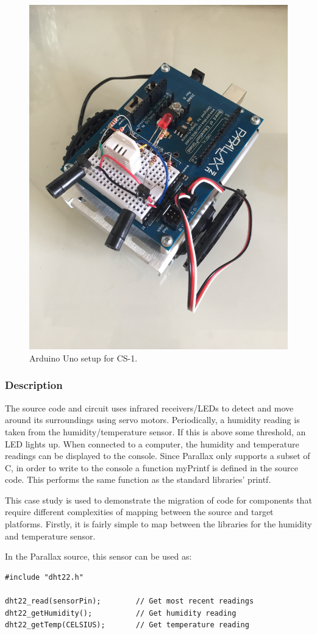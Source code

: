 \documentclass{UoYCSproject}
\begin{document}
\begin{figure}[h!]
  \centering
  \includegraphics[width=0.5\linewidth]{graphics/cs1_arduino_board.JPG}
  \caption{Arduino Uno setup for CS-1.}
  \label{fig:cs1_arduino_board}
\end{figure}

\subsubsection{Description} \label{cs1_description}
The source code and circuit uses infrared receivers/LEDs to detect and move around its surroundings using servo motors. Periodically, a humidity reading is taken from the humidity/temperature sensor. If this is above some threshold, an LED lights up. When connected to a computer, the humidity and temperature readings can be displayed to the console. Since Parallax only supports a subset of C, in order to write to the console a function myPrintf is defined in the source code. This performs the same function as the standard libraries' printf.

This case study is used to demonstrate the migration of code for components that require different complexities of mapping between the source and target platforms. Firstly, it is fairly simple to map between the libraries for the humidity and temperature sensor. 

In the Parallax source, this sensor can be used as:
\begin{verbatim}
#include "dht22.h"

dht22_read(sensorPin);        // Get most recent readings
dht22_getHumidity();          // Get humidity reading
dht22_getTemp(CELSIUS);       // Get temperature reading
\end{verbatim}
\end{document}
